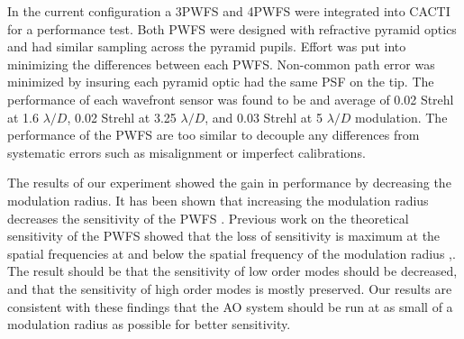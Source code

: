 In the current configuration a 3PWFS and 4PWFS were integrated into CACTI for a performance test. Both PWFS were designed with refractive pyramid optics and had similar sampling across the pyramid pupils. Effort was put into minimizing the differences between each PWFS. Non-common path error was minimized by insuring each pyramid optic had the same PSF on the tip. The performance of each wavefront sensor was found to be and average of 0.02 Strehl at 1.6 $\lambda/D$, 0.02 Strehl at 3.25 $\lambda/D$, and 0.03 Strehl at 5 $\lambda/D$ modulation. The performance of the PWFS are too similar to decouple any differences from systematic errors such as misalignment or imperfect calibrations.

The results of our experiment showed the gain in performance by decreasing the modulation radius. It has been shown that increasing the modulation radius decreases the sensitivity of the PWFS \citep{correia2020performance}. Previous work on the theoretical sensitivity of the PWFS showed that the loss of sensitivity is maximum at the spatial frequencies at and below the spatial frequency of the modulation radius \citep{guyon2005} ,\citep{verinaud2004nature}. The result should be that the sensitivity of low order modes should be decreased, and that the sensitivity of high order modes is mostly preserved. Our results are consistent with these findings that the AO system should be run at as small of a modulation radius as possible for better sensitivity. 

